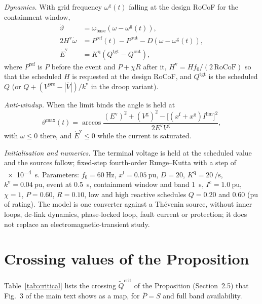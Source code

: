 \documentclass[11pt,a4paper]{article}
\newcommand{\pu}{\ensuremath{\mathrm{pu}}}
\begin{document}
\emph{Dynamics.} With grid frequency $\omega^{\mathrm{g}}(t)$ falling at the
design RoCoF for the containment window,
\begin{align}
  \dot{\vartheta} &= \omega_{\mathrm{base}} (\omega - \omega^{\mathrm{g}}(t)), \\
  2 H^{\mathrm{v}} \dot{\omega} &= P^{\mathrm{ref}}(t) - P^{\mathrm{out}}
    - D (\omega - \omega^{\mathrm{g}}(t)), \\
  \dot{E}^{\mathrm{v}} &= K^{\mathrm{q}} (Q^{\mathrm{tgt}} - Q^{\mathrm{out}}),
\end{align}
where $P^{\mathrm{ref}}$ is $P$ before the event and $P + \chi R$ after it,
$H^{\mathrm{v}} = H f_0 / (2\,\mathrm{RoCoF})$ so that the scheduled $H$ is
requested at the design RoCoF, and $Q^{\mathrm{tgt}}$ is the scheduled $Q$
(or $Q + (V^{\mathrm{pre}} - |\bar{V}|)/k^{\mathrm{v}}$ in the droop
variant).

\emph{Anti-windup.} When the limit binds the angle is held at
\begin{equation}
  \vartheta^{\max}(t) = \arccos\frac{(E^{\mathrm{v}})^2 + (V^{\mathrm{g}})^2
    - \bigl[(x^{\mathrm{f}} + x^{\mathrm{g}}) I^{\lim}\bigr]^2}
    {2 E^{\mathrm{v}} V^{\mathrm{g}}} ,
\end{equation}
with $\dot{\omega} \le 0$ there, and $\dot{E}^{\mathrm{v}} \le 0$ while the
current is saturated.

\emph{Initialisation and numerics.} The terminal voltage is held at the
scheduled value and the sources follow; fixed-step fourth-order Runge--Kutta
with a step of \SI{e-4}{\second}. Parameters: $f_0 = \SI{60}{\hertz}$,
$x^{\mathrm{f}} = \SI{0.05}{\pu}$, $D = 20$, $K^{\mathrm{q}} =
\SI{20}{\per\second}$, $k^{\mathrm{v}} = \SI{0.04}{\pu}$, event at
\SI{0.5}{\second}, containment window and band \SI{1}{\second},
$I^{\mathrm{c}} = \SI{1.0}{\pu}$, $\chi = 1$, $P = 0.60$, $R = 0.10$, low and
high reactive schedules $Q = 0.20$ and $0.60$ (pu of rating). The model is one converter against a Th\'evenin source, without
inner loops, dc-link dynamics, phase-locked loop, fault current or
protection; it does not replace an electromagnetic-transient study.

\clearpage
\section{Crossing values of the Proposition}
\label{s:critical}

Table~\ref{tab:critical} lists the crossing $\tilde{Q}^{\mathrm{crit}}$ of the
Proposition (Section~2.5) that Fig.~3 of the main text shows as a map, for
$\bar{P} = S$ and full band availability.
\end{document}
